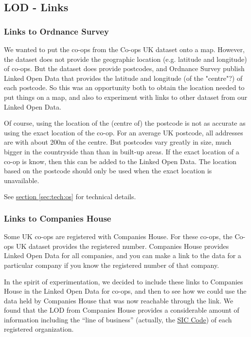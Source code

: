 \documentclass[11pt,twoside,a4paper]{article}
\begin{document}
\subsection{LOD - Links}

\subsubsection{Links to Ordnance Survey}

We wanted to put the co-ops from the Co-ops UK dataset onto a map.
However, the dataset does not provide the geographic location (e.g. latitude and longitude) of co-ops.
But the dataset does provide postcodes, and Ordnance Survey publish Linked Open Data that provides the latitude and longitude (of the "centre"?) of each postcode.
So this was an opportunity both to obtain the location needed to put things on a map, and also to experiment with links to other dataset from our Linked Open Data.

Of course, using the location of the (centre of) the postcode is not as accurate as using the exact location of the co-op. 
For an average UK postcode, all addresses are with about 200m of the centre.
But postcodes vary greatly in size, much bigger in the countryside than than in built-up areas.
If the exact location of a co-op is know, then this can be added to the Linked Open Data.
The location based on the postcode should only be used when the exact location is unavailable.

See \hyperref[sec:tech:os]{section \ref{sec:tech:os}} for technical details.

\subsubsection{Links to Companies House}

Some UK co-ops are registered with Companies House.
For these co-ops, the Co-ops UK dataset provides the registered number.
Companies House provides Linked Open Data for all companies, and you can make a link to the data for a particular company if you know the registered number of that company.

In the spirit of experimentation, we decided to include these links to Companies House in the Linked Open Data for co-ops,
and then to see how we could use the data held by Companies House that was now reachable through the link.
We found that the LOD from Companies House provides a considerable amount of information including the ``line of business'' 
(actually, the \href{https://en.wikipedia.org/wiki/Standard_Industrial_Classification}{SIC Code})
of each registered organization.
\end{document}
